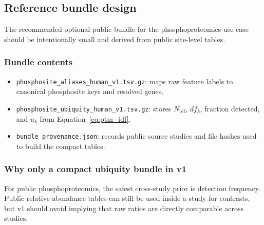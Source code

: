 \documentclass[11pt]{article}
\begin{document}
\subsection{Reference bundle design}
The recommended optional public bundle for the phosphoproteomics use case should
be intentionally small and derived from public site-level tables.

\subsubsection{Bundle contents}
\begin{itemize}
\item \texttt{phosphosite\_aliases\_human\_v1.tsv.gz}: maps raw feature labels to
canonical phosphosite keys and resolved genes.
\item \texttt{phosphosite\_ubiquity\_human\_v1.tsv.gz}: stores
$N_{\mathrm{ref}}$, $df_k$, fraction detected, and $u_k$ from
Equation~\eqref{eq:ptm_idf}.
\item \texttt{bundle\_provenance.json}: records public source studies and file
hashes used to build the compact tables.
\end{itemize}

\subsubsection{Why only a compact ubiquity bundle in v1}
For public phosphoproteomics, the safest cross-study prior is detection
frequency. Public relative-abundance tables can still be used inside a study for
contrasts, but v1 should avoid implying that raw ratios are directly comparable
across studies.
\end{document}
